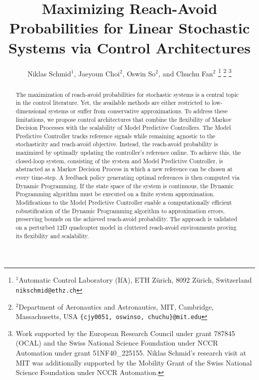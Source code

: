 \documentclass{IEEEtran}
\begin{document}
\title{Maximizing Reach-Avoid Probabilities for Linear Stochastic Systems via Control Architectures}
\author{Niklas Schmid$^{1}$, Jaeyoun Choi$^{2}$, Oswin So$^{2}$, and Chuchu Fan$^{2}$%
    \thanks{$^{1}$Automatic Control Laboratory (IfA), ETH Z\"urich, 8092 Z\"urich, Switzerland
            {\tt\small nikschmid@ethz.ch}}%
    \thanks{$^{2}$Department of Aeronautics and Astronautics, MIT, Cambridge, Massachusetts, USA
            {\tt\small \{cjy0051, oswinso, chuchu\}@mit.edu}%
            }%
    \thanks{Work supported by the European Research Council under grant 787845 (OCAL) and the Swiss National Science Foundation under NCCR Automation under grant 51NF40\_225155. Niklas Schmid’s research visit at MIT was additionally supported by the Mobility Grant of the Swiss National Science Foundation under NCCR Automation.}%
    }

\maketitle

\begin{abstract}
    The maximization of reach-avoid probabilities for stochastic systems is a central topic in the control literature. Yet, the available methods are either restricted to low-dimensional systems or suffer from conservative approximations. To address these limitations, we propose control architectures that combine the flexibility of Markov Decision Processes with the scalability of Model Predictive Controllers. The Model Predictive Controller tracks reference signals while remaining agnostic to the stochasticity and reach-avoid objective. Instead, the reach-avoid probability is maximized by optimally updating the controller's reference online. To achieve this, the closed-loop system, consisting of the system and Model Predictive Controller, is abstracted as a Markov Decision Process in which a new reference can be chosen at every time-step. A feedback policy generating optimal references is then computed via Dynamic Programming. If the state space of the system is continuous, the Dynamic Programming algorithm must be executed on a finite system approximation. Modifications to the Model Predictive Controller enable a computationally efficient robustification of the Dynamic Programming algorithm to approximation errors, preserving bounds on the achieved reach-avoid probability. The approach is validated on a perturbed 12D quadcopter model in cluttered reach-avoid environments proving its flexibility and scalability.
\end{abstract}
\end{document}
